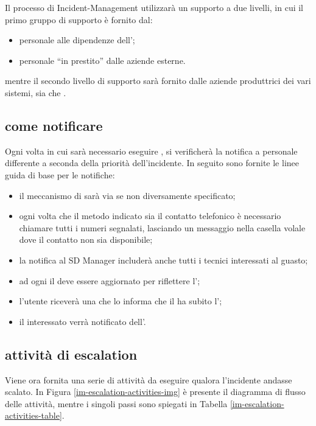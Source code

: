 Il processo di \ac{Incident-Management} utilizzarà un supporto a due livelli, in cui il primo gruppo di supporto è fornito dal:

\begin{itemize}
\item{personale alle dipendenze dell'\entity{};}
\item{personale ``in prestito'' dalle aziende esterne.}
\end{itemize}

mentre il secondo livello di supporto sarà fornito dalle aziende produttrici dei vari sistemi, sia  che .

\subsection[Come notificare]{come notificare}
\label{im-escalation-how-to}
Ogni volta in cui sarà necessario eseguire , si verificherà la notifica a personale differente a seconda della priorità dell'incidente. In seguito sono fornite le linee guida di base per le notifiche:

\begin{itemize}
\item{il meccanismo di  sarà via  se non diversamente specificato;}
\item{ogni volta che il metodo indicato sia il contatto telefonico è necessario chiamare tutti i numeri segnalati, lasciando un messaggio nella casella volale dove il contatto non sia disponibile;}
\item{la notifica al \ac{SD Manager} includerà anche tutti i tecnici interessati al guasto;}
\item{ad ogni  il  deve essere aggiornato per riflettere l';}
\item{l'utente riceverà una  che lo informa che il  ha subito l';}
\item{il  interessato verrà notificato dell'.}
\end{itemize}

\subsection[Attività di escalation]{attività di escalation}
\label{im-escalation-activities}
Viene ora fornita una serie di attività da eseguire qualora l'incidente andasse scalato. In Figura \ref{im-escalation-activities-img} è presente il diagramma di flusso delle attività, mentre i singoli passi sono spiegati in Tabella \ref{im-escalation-activities-table}.

